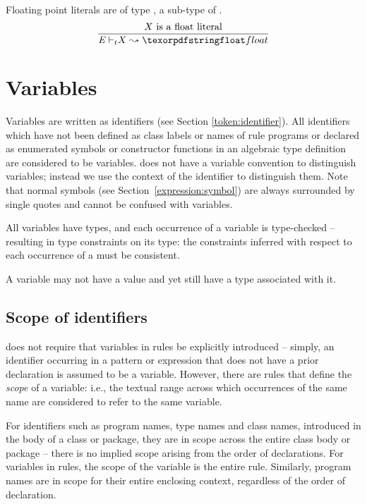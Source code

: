 Floating point literals are of type , a sub-type of .
\begin{equation}
\frac{X \mbox{ is a float literal}}
{\typeprd{E}{X}{\q{float}}}
\end{equation}

\section{Variables}
\label{expression:variable}

Variables are written as identifiers (see Section \vref{token:identifier}). All identifiers which have not been defined as class labels or names of rule programs or declared as enumerated symbols or constructor functions in an algebraic type definition are considered to be variables. \go does not have a variable convention to distinguish variables; instead we use the context of the identifier to distinguish them. Note that normal symbols (see Section~\vref{expression:symbol}) are always surrounded by single quotes and cannot be confused with variables.

All variables have types, and each occurrence of a variable is type-checked -- resulting in type constraints on its type: the constraints inferred with respect to each occurrence of a must be consistent.  

A variable may not have a value and yet still have a type associated with it.

\subsection{Scope of identifiers}
\label{variable:scope}

\go does not require that variables in rules be explicitly introduced -- simply, an identifier occurring in a pattern or expression that does not have a prior declaration is assumed to be a variable. However, there are rules that define the \emph{scope} of a variable: i.e., the textual range across which occurrences of the same name are considered to refer to the same variable.

For identifiers such as program names, type names and class names, introduced in the body of a class or package, they are in scope across the entire class body or package -- there is no implied scope arising from the order of declarations. For variables in rules, the scope of the variable is the entire rule. Similarly, program names are in scope for their entire enclosing context, regardless of the order of declaration.

